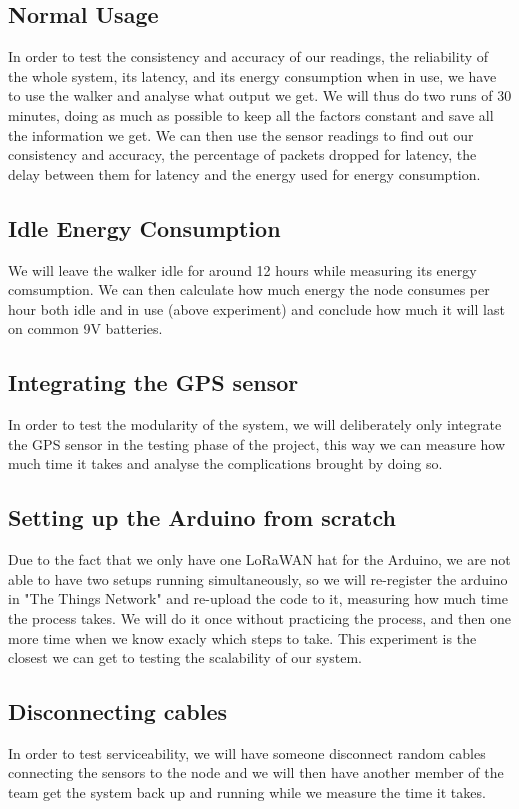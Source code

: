 	\subsection{Normal Usage}
		In order to test the consistency and accuracy of our readings, the reliability of the whole system, its latency, and its energy consumption when in use, we have to use the walker and analyse what output we get. We will thus do two runs of 30 minutes, doing as much as possible to keep all the factors constant and save all the information we get. We can then use the sensor readings to find out our consistency and accuracy, the percentage of packets dropped for latency, the delay between them for latency and the energy used for energy consumption.

	\subsection{Idle Energy Consumption}
		We will leave the walker idle for around 12 hours while measuring its energy comsumption.
		We can then calculate how much energy the node consumes per hour both idle and in use (above experiment) and conclude how much it will last on common 9V batteries.

	\subsection{Integrating the GPS sensor}
		In order to test the modularity of the system, we will deliberately only integrate the GPS sensor in the testing phase of the project, this way we can measure how much time it takes and analyse the complications brought by doing so.

	\subsection{Setting up the Arduino from scratch}
		Due to the fact that we only have one LoRaWAN hat for the Arduino, we are not able to have two setups running simultaneously, so we will re-register the arduino in "The Things Network" and re-upload the code to it, measuring how much time the process takes. We will do it once without practicing the process, and then one more time when we know exacly which steps to take. This experiment is the closest we can get to testing the scalability of our system.

	\subsection{Disconnecting cables}
		In order to test serviceability, we will have someone disconnect random cables connecting the sensors to the node and we will then have another member of the team get the system back up and running while we measure the time it takes.

